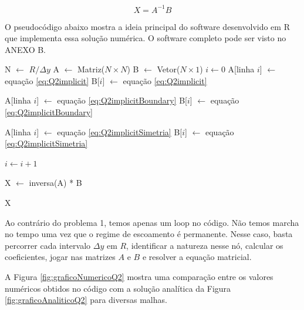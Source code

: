 \begin{equation}\label{eq:Q2sistemalinear}
    X = A^{-1} B
\end{equation}

O pseudocódigo abaixo mostra a ideia principal do software desenvolvido em R que implementa
essa solução numérica. O software completo pode ser visto no ANEXO B.

\begin{algorithmic}
    \State N $\gets$ $R / \Delta y$
    \State A $\gets$ Matriz($N \times N$)
    \State B $\gets$ Vetor($N \times 1$)
    \State $i \gets 0$
            \State A[linha $i$] $\gets$ equação \eqref{eq:Q2implicit}
            \State B[$i$] $\gets$ equação \eqref{eq:Q2implicit}
        \EndIf

            \State A[linha $i$] $\gets$ equação \eqref{eq:Q2implicitBoundary}
            \State B[$i$] $\gets$ equação \eqref{eq:Q2implicitBoundary}
        \EndIf

            \State A[linha $i$] $\gets$ equação \eqref{eq:Q2implicitSimetria}
            \State B[$i$] $\gets$ equação \eqref{eq:Q2implicitSimetria}
        \EndIf

        \State $i \gets i + 1$
    \EndFor

    \State X $\gets$ inversa(A) * B

    \Return X
\end{algorithmic}

Ao contrário do problema 1, temos apenas um loop no código. Não temos marcha no tempo uma vez
que o regime de escoamento é permanente. Nesse caso, basta percorrer cada intervalo
$\Delta y$ em $R$, identificar a natureza nesse nó, calcular os coeficientes, jogar nas matrizes
$A$ e $B$ e resolver a equação matricial.

A Figura \ref*{fig:graficoNumericoQ2} mostra uma comparação entre os valores numéricos obtidos no código 
com a solução analítica da Figura \ref*{fig:graficoAnaliticoQ2} para diversas malhas.

